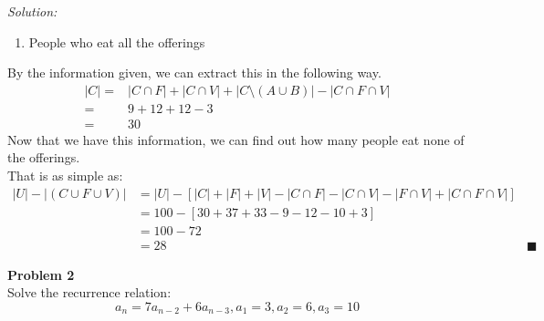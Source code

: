 \documentclass[11pt,letterpaper]{article}
\newenvironment{problem}[2][Problem]                                  
        { \begin{mdframed}[backgroundcolor=gray!20] \textbf{#1 #2} \\}
        {  \end{mdframed}}
\newenvironment{solution}                      
        {\begin{mdframed}\textit{Solution:} \\}
        {\end{mdframed}}
\begin{document}
\begin{solution}
\begin{enumerate}
    \item People who eat all the offerings
  \end{enumerate}
  By the information given, we can extract this in the following way.
  \begin{align*}
    \lvert C \rvert =& \lvert C \cap F \rvert + \lvert C \cap V \rvert + \lvert C \setminus (A \cup B) \rvert - \lvert C \cap F \cap V \rvert\\ 
                    =& 9 + 12 + 12 - 3\\
                    =& 30
  \end{align*}
  Now that we have this information, we can find out how many people eat none of the offerings.\\ 
  That is as simple as: 
  \begin{align*}
    \lvert U \rvert - \lvert (C \cup F \cup V) \rvert &= \lvert U \rvert - [\lvert C \rvert + \lvert F \rvert + \lvert V \rvert - \lvert C \cap F \rvert - \lvert C \cap V \rvert - \lvert F \cap V \rvert + \lvert C \cap F \cap V \rvert]\\ 
                                                      &= 100 - [30 + 37 + 33 - 9 - 12 - 10 + 3]\\
                                                      &= 100 - 72\\
                                                      &= 28 & \blacksquare
  \end{align*}
\end{solution}

\begin{problem}{2}
Solve the recurrence relation:
\[
  a_n = 7a_{n-2} + 6 a_{n-3}, a_1 = 3, a_2 = 6, a_3 = 10
\]
\end{problem}
\end{document}
